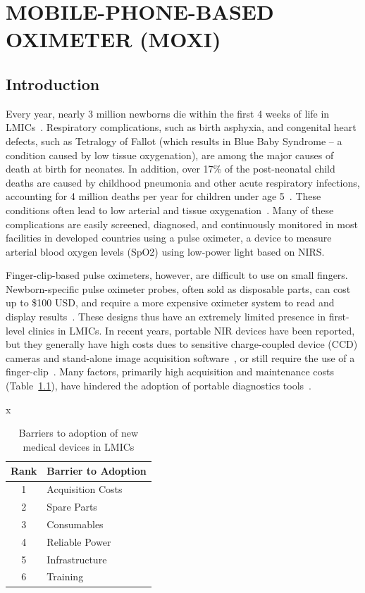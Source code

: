 
\chapter{MOBILE-PHONE-BASED OXIMETER (MOXI)} %
\label{chap:moxi}


\section{Introduction} %
\label{chap:moxi:introduction}
Every year, nearly 3 million newborns die within the first 4 weeks of life in \ac{LMIC}s~\cite{Worldhealthorganization2006}. Respiratory complications, such as birth asphyxia, and congenital heart defects, such as Tetralogy of Fallot (which results in Blue Baby Syndrome – a condition caused by low tissue oxygenation), are among the major causes of death at birth for neonates. In addition, over 17\% of the post-neonatal child deaths are caused by childhood pneumonia and other acute respiratory infections, accounting for 4 million deaths per year for children under age 5~\cite{Alexander2018}. These conditions often lead to low arterial and tissue oxygenation~\cite{Weber2003}. Many of these complications are easily screened, diagnosed, and continuously monitored in most facilities in developed countries using a pulse oximeter, a device to measure arterial blood oxygen levels (SpO2) using low-power light based on NIRS. 

Finger-clip-based pulse oximeters, however, are difficult to use on small fingers. Newborn-specific pulse oximeter probes, often sold as disposable parts, can cost up to \$100 USD, and require a more expensive oximeter system to read and display results~\cite{Ouro-BangnaMaman2005,Heywood1989}. These designs thus have an extremely limited presence in first-level clinics in LMICs. In recent years, portable NIR devices have been reported, but they generally have high costs dues to sensitive charge-coupled device (CCD) cameras and stand-alone image acquisition software~\cite{Jung2013}, or still require the use of a finger-clip~\cite{Karlen2011,Hudson2012}. Many factors, primarily high acquisition and maintenance costs (Table~\ref{tab:lmicbarriers}), have hindered the adoption of portable diagnostics tools~\cite{Malkin2007}. 

\begin{table}[]x
\centering
\caption{Barriers to adoption of new medical devices in LMICs}
\label{tab:lmicbarriers}
\begin{tabular}{@{}cl@{}}
\toprule
Rank & Barrier to Adoption \\ \midrule
1    & Acquisition Costs   \\
2    & Spare Parts         \\
3    & Consumables         \\
4    & Reliable Power      \\
5    & Infrastructure      \\
6    & Training            \\ \bottomrule
\end{tabular}
\end{table}

